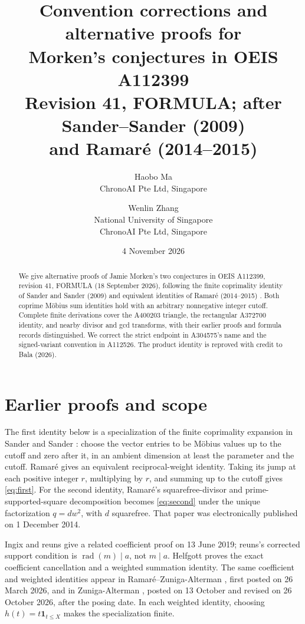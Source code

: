 \documentclass[11pt]{article}
\title{Convention corrections and alternative proofs for\\
Morken's conjectures in OEIS A112399\\
\large Revision 41, FORMULA; after Sander--Sander (2009)\\
and Ramar\'e (2014--2015)}
\author{Haobo Ma\\\small ChronoAI Pte Ltd, Singapore
\and Wenlin Zhang\\\small National University of Singapore\\
\small ChronoAI Pte Ltd, Singapore}
\date{4 November 2026}
\newcommand{\rad}{\operatorname{rad}}
\begin{document}
\maketitle
\begin{abstract}
We give alternative proofs of Jamie Morken's two conjectures in OEIS
A112399, revision 41, FORMULA (18 September 2026), following the finite
coprimality identity of Sander and Sander (2009) and equivalent identities
of Ramar\'e (2014--2015) \cite{a112399,sander,ramare2014,ramare2015}.
Both coprime M\"obius sum identities hold with an arbitrary nonnegative
integer cutoff. Complete finite derivations cover the A400203 triangle,
the rectangular A372700 identity, and nearby divisor and gcd transforms,
with their earlier proofs and formula records distinguished. We correct
the strict endpoint in A304575's name and the signed-variant convention
in A112526. The product identity is reproved with credit to Bala (2026).
\end{abstract}

\section*{Earlier proofs and scope}
The first identity below is a specialization of the finite coprimality
expansion in Sander and Sander \cite[proof of Proposition 4, (5)--(7)]{sander}:
choose the vector entries to be M\"obius values up to the cutoff and zero
after it, in an ambient dimension at least the parameter and the cutoff.
Ramar\'e \cite[\S1, immediately after (1.2)]{ramare2014} gives an equivalent
reciprocal-weight identity. Taking its jump at each positive integer $r$,
multiplying by $r$, and summing up to the cutoff gives \eqref{eq:first}.
For the second identity, Ramar\'e's \cite[\S16, (16.1)]{ramare2015}
squarefree-divisor and prime-supported-square decomposition becomes
\eqref{eq:second} under the unique factorization $q=dw^2$, with $d$
squarefree. That paper was electronically published on 1 December 2014.

Ingix and reuns \cite{mse2019} give a related coefficient proof on
13 June 2019; reuns's corrected support condition is $\rad(m)\mid a$,
not $m\mid a$. Helfgott \cite[\S5.3.4, (5.73)]{helfgott} proves the exact
coefficient cancellation and a weighted summation identity. The same coefficient and
weighted identities appear in Ramar\'e--Zuniga-Alterman
\cite[Lemma 2.5]{rz2026}, first posted on 26 March 2026, and in
Zuniga-Alterman \cite[Lemma 7.1]{z2026}, posted on 13 October and revised
on 26 October 2026, after the posing date. In each weighted identity,
choosing $h(t)=t\mathbf1_{t\le X}$ makes the specialization finite.
\end{document}
